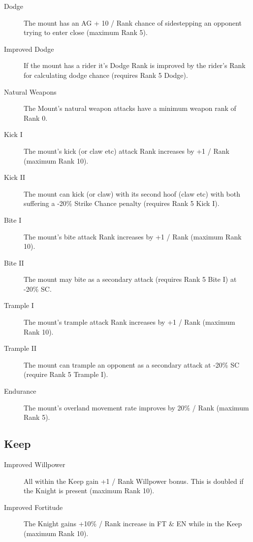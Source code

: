 \documentclass[a4paper]{article}
\begin{document}
\begin{multicols*}{3}
\begin{description}
\item[Dodge] The mount has an AG + 10 / Rank chance of sidestepping an
opponent trying to enter close (maximum Rank 5).

\item[Improved Dodge] If the mount has a rider it's Dodge Rank is
improved by the rider's Rank for calculating dodge chance (requires
Rank 5 Dodge).

\item[Natural Weapons] The Mount's natural weapon attacks have a
minimum weapon rank of Rank 0.

\item[Kick I] The mount's kick (or claw etc) attack Rank increases by +1
/ Rank (maximum Rank 10).

\item[Kick II] The mount can kick (or claw) with its second hoof (claw
etc) with both suffering a -20\% Strike Chance penalty (requires Rank
5 Kick I).

\item[Bite I] The mount's bite attack Rank increases by +1 / Rank
(maximum Rank 10).

\item[Bite II] The mount may bite as a secondary attack (requires Rank
5 Bite I) at -20\% SC.

\item[Trample I] The mount's trample attack Rank increases by +1 /
Rank (maximum Rank 10).

\item[Trample II] The mount can trample an opponent as a secondary
attack at -20\% SC (require Rank 5 Trample I).

\item[Endurance] The mount's overland movement rate improves by 20\% /
Rank (maximum Rank 5).

\end{description}

\subsection{Keep}

\begin{description}

\item[Improved Willpower] All within the Keep gain +1 / Rank Willpower
bonus.  This is doubled if the Knight is present (maximum Rank 10).

\item[Improved Fortitude] The Knight gains +10\% / Rank increase in FT
\& EN while in the Keep (maximum Rank 10).


\end{description}
\end{multicols*}
\end{document}
